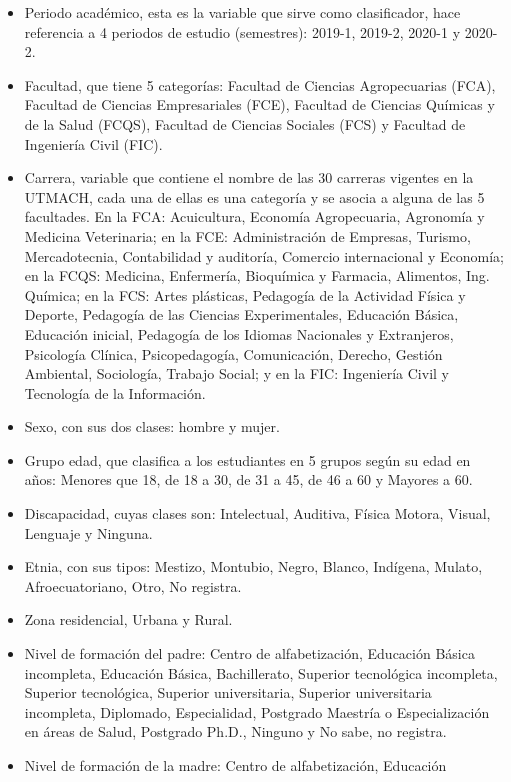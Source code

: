 \documentclass[water,article,submit,moreauthors,pdftex]{mdpi}
\begin{document}
\begin{itemize}
\item
  Periodo académico, esta es la variable que sirve como clasificador,
  hace referencia a 4 periodos de estudio (semestres): 2019-1, 2019-2,
  2020-1 y 2020-2.
\item
  Facultad, que tiene 5 categorías: Facultad de Ciencias Agropecuarias
  (FCA), Facultad de Ciencias Empresariales (FCE), Facultad de Ciencias
  Químicas y de la Salud (FCQS), Facultad de Ciencias Sociales (FCS) y
  Facultad de Ingeniería Civil (FIC).
\item
  Carrera, variable que contiene el nombre de las 30 carreras vigentes
  en la UTMACH, cada una de ellas es una categoría y se asocia a alguna
  de las 5 facultades. En la FCA: Acuicultura, Economía Agropecuaria,
  Agronomía y Medicina Veterinaria; en la FCE: Administración de
  Empresas, Turismo, Mercadotecnia, Contabilidad y auditoría, Comercio
  internacional y Economía; en la FCQS: Medicina, Enfermería, Bioquímica
  y Farmacia, Alimentos, Ing. Química; en la FCS: Artes plásticas,
  Pedagogía de la Actividad Física y Deporte, Pedagogía de las Ciencias
  Experimentales, Educación Básica, Educación inicial, Pedagogía de los
  Idiomas Nacionales y Extranjeros, Psicología Clínica, Psicopedagogía,
  Comunicación, Derecho, Gestión Ambiental, Sociología, Trabajo Social;
  y en la FIC: Ingeniería Civil y Tecnología de la Información.
\item
  Sexo, con sus dos clases: hombre y mujer.
\item
  Grupo edad, que clasifica a los estudiantes en 5 grupos según su edad
  en años: Menores que 18, de 18 a 30, de 31 a 45, de 46 a 60 y Mayores
  a 60.
\item
  Discapacidad, cuyas clases son: Intelectual, Auditiva, Física Motora,
  Visual, Lenguaje y Ninguna.
\item
  Etnia, con sus tipos: Mestizo, Montubio, Negro, Blanco, Indígena,
  Mulato, Afroecuatoriano, Otro, No registra.
\item
  Zona residencial, Urbana y Rural.
\item
  Nivel de formación del padre: Centro de alfabetización, Educación
  Básica incompleta, Educación Básica, Bachillerato, Superior
  tecnológica incompleta, Superior tecnológica, Superior universitaria,
  Superior universitaria incompleta, Diplomado, Especialidad, Postgrado
  Maestría o Especialización en áreas de Salud, Postgrado Ph.D., Ninguno
  y No sabe, no registra.
\item
  Nivel de formación de la madre: Centro de alfabetización, Educación

\end{itemize}
\end{document}
